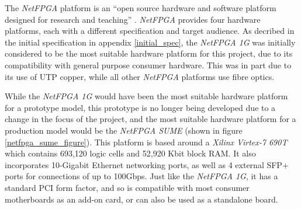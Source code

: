 


The \textit{NetFPGA} platform is an ``open source hardware and software platform designed for research and teaching'' \cite{NetFPGA}.
\textit{NetFPGA} provides four hardware platforms, each with a different specification and target audience. As decribed in the initial specification in appendix \ref{initial_spec}, the \textit{NetFPGA 1G} was initially considered to be the most suitable hardware platform for this project, due to its compatibility with general purpose consumer hardware.
This was in part due to its use of UTP copper, while all other \textit{NetFPGA} platforms use fibre optics.

While the \textit{NetFPGA 1G} would have been the most suitable hardware platform for a prototype model, this prototype is no longer being developed due to a change in the focus of the project, and the most suitable hardware platform for a production model would be the \textit{NetFPGA SUME} (shown in figure \ref{netfpga_sume_figure}). This platform is based around a \textit{Xilinx Virtex-7 690T} \cite{virtex7-690t} which contains 693,120 logic cells and 52,920 Kbit block RAM. It also incorporates 10-Gigabit Ethernet networking ports, as well as 4 external SFP+ ports for connections of up to 100Gbps. Just like the \textit{NetFPGA 1G}, it has a standard PCI form factor, and so is compatible with most consumer motherboards as an add-on card, or can also be used as a standalone board.


